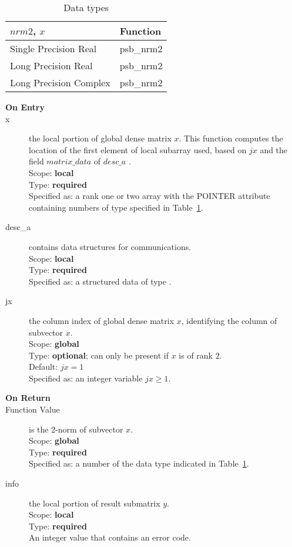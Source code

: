 \begin{table}[h]
\begin{center}
\begin{tabular}{ll}
\hline
$nrm2$, $x$ & {\bf Function}\\
\hline
Single Precision Real & psb\_nrm2\\
Long Precision Real & psb\_nrm2 \\
Long Precision Complex & psb\_nrm2 \\
\hline
\end{tabular}
\end{center}
\caption{Data types\label{tab:f90nrm2}}
\end{table}

\begin{description}
\item[\bf On Entry]
\item[x] the local portion of global dense matrix
$x$. This function computes the location of the first element of
local subarray used, based on $jx$ and the field $matrix\_data$ of $desc\_a$ . \\
Scope: {\bf local} \\
Type: {\bf required} \\
Specified as:  a rank one or two array with the POINTER attribute
containing numbers of type specified in
Table~\ref{tab:f90nrm2}.
\item[desc\_a] contains data structures for communications.\\
Scope: {\bf local} \\
Type: {\bf required}\\
Specified as: a structured data of type \descdata.
\item[jx]  the column index of global dense matrix $x$,
identifying the column of subvector $x$.\\
Scope: {\bf global} \\
Type: {\bf optional}; can only be present if $x$ is of rank 2.\\	
Default: $jx = 1$\\	
Specified as: an integer variable $jx\ge 1$. 

\item[\bf On Return] 
\item[Function Value] is the 2-norm of subvector $x$.\\
Scope: {\bf global} \\
Type: {\bf required} \\
Specified as: a number of the data type indicated in Table~\ref{tab:f90nrm2}.
\item[info] the local portion of result submatrix $y$.\\
Scope: {\bf local} \\
Type: {\bf required} \\
An integer value that contains an error code. 
\end{description}

